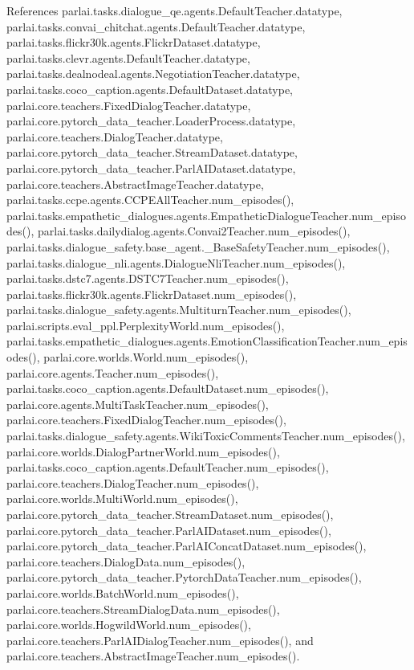 References parlai.\+tasks.\+dialogue\+\_\+qe.\+agents.\+Default\+Teacher.\+datatype, parlai.\+tasks.\+convai\+\_\+chitchat.\+agents.\+Default\+Teacher.\+datatype, parlai.\+tasks.\+flickr30k.\+agents.\+Flickr\+Dataset.\+datatype, parlai.\+tasks.\+clevr.\+agents.\+Default\+Teacher.\+datatype, parlai.\+tasks.\+dealnodeal.\+agents.\+Negotiation\+Teacher.\+datatype, parlai.\+tasks.\+coco\+\_\+caption.\+agents.\+Default\+Dataset.\+datatype, parlai.\+core.\+teachers.\+Fixed\+Dialog\+Teacher.\+datatype, parlai.\+core.\+pytorch\+\_\+data\+\_\+teacher.\+Loader\+Process.\+datatype, parlai.\+core.\+teachers.\+Dialog\+Teacher.\+datatype, parlai.\+core.\+pytorch\+\_\+data\+\_\+teacher.\+Stream\+Dataset.\+datatype, parlai.\+core.\+pytorch\+\_\+data\+\_\+teacher.\+Parl\+A\+I\+Dataset.\+datatype, parlai.\+core.\+teachers.\+Abstract\+Image\+Teacher.\+datatype, parlai.\+tasks.\+ccpe.\+agents.\+C\+C\+P\+E\+All\+Teacher.\+num\+\_\+episodes(), parlai.\+tasks.\+empathetic\+\_\+dialogues.\+agents.\+Empathetic\+Dialogue\+Teacher.\+num\+\_\+episodes(), parlai.\+tasks.\+dailydialog.\+agents.\+Convai2\+Teacher.\+num\+\_\+episodes(), parlai.\+tasks.\+dialogue\+\_\+safety.\+base\+\_\+agent.\+\_\+\+Base\+Safety\+Teacher.\+num\+\_\+episodes(), parlai.\+tasks.\+dialogue\+\_\+nli.\+agents.\+Dialogue\+Nli\+Teacher.\+num\+\_\+episodes(), parlai.\+tasks.\+dstc7.\+agents.\+D\+S\+T\+C7\+Teacher.\+num\+\_\+episodes(), parlai.\+tasks.\+flickr30k.\+agents.\+Flickr\+Dataset.\+num\+\_\+episodes(), parlai.\+tasks.\+dialogue\+\_\+safety.\+agents.\+Multiturn\+Teacher.\+num\+\_\+episodes(), parlai.\+scripts.\+eval\+\_\+ppl.\+Perplexity\+World.\+num\+\_\+episodes(), parlai.\+tasks.\+empathetic\+\_\+dialogues.\+agents.\+Emotion\+Classification\+Teacher.\+num\+\_\+episodes(), parlai.\+core.\+worlds.\+World.\+num\+\_\+episodes(), parlai.\+core.\+agents.\+Teacher.\+num\+\_\+episodes(), parlai.\+tasks.\+coco\+\_\+caption.\+agents.\+Default\+Dataset.\+num\+\_\+episodes(), parlai.\+core.\+agents.\+Multi\+Task\+Teacher.\+num\+\_\+episodes(), parlai.\+core.\+teachers.\+Fixed\+Dialog\+Teacher.\+num\+\_\+episodes(), parlai.\+tasks.\+dialogue\+\_\+safety.\+agents.\+Wiki\+Toxic\+Comments\+Teacher.\+num\+\_\+episodes(), parlai.\+core.\+worlds.\+Dialog\+Partner\+World.\+num\+\_\+episodes(), parlai.\+tasks.\+coco\+\_\+caption.\+agents.\+Default\+Teacher.\+num\+\_\+episodes(), parlai.\+core.\+teachers.\+Dialog\+Teacher.\+num\+\_\+episodes(), parlai.\+core.\+worlds.\+Multi\+World.\+num\+\_\+episodes(), parlai.\+core.\+pytorch\+\_\+data\+\_\+teacher.\+Stream\+Dataset.\+num\+\_\+episodes(), parlai.\+core.\+pytorch\+\_\+data\+\_\+teacher.\+Parl\+A\+I\+Dataset.\+num\+\_\+episodes(), parlai.\+core.\+pytorch\+\_\+data\+\_\+teacher.\+Parl\+A\+I\+Concat\+Dataset.\+num\+\_\+episodes(), parlai.\+core.\+teachers.\+Dialog\+Data.\+num\+\_\+episodes(), parlai.\+core.\+pytorch\+\_\+data\+\_\+teacher.\+Pytorch\+Data\+Teacher.\+num\+\_\+episodes(), parlai.\+core.\+worlds.\+Batch\+World.\+num\+\_\+episodes(), parlai.\+core.\+teachers.\+Stream\+Dialog\+Data.\+num\+\_\+episodes(), parlai.\+core.\+worlds.\+Hogwild\+World.\+num\+\_\+episodes(), parlai.\+core.\+teachers.\+Parl\+A\+I\+Dialog\+Teacher.\+num\+\_\+episodes(), and parlai.\+core.\+teachers.\+Abstract\+Image\+Teacher.\+num\+\_\+episodes().

